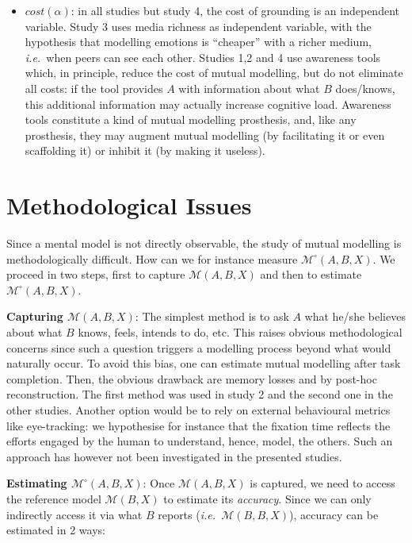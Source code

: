 \documentclass[natbib]{svjour3}
\newcommand{\ie}{{\textit{i.e.\ }}}
\newcommand{\model}[3]{{$\mathcal{M}(#1, #2, #3)$}}
\newcommand{\refmodel}[2]{{$\mathcal{M}(#1, #2)$}}
\newcommand{\Model}[3]{{$\mathcal{M}^{\circ}(#1, #2, #3)$}}
\begin{document}
\begin{itemize}
    \item $cost(\alpha)$: in all studies but study 4, the cost of  grounding is
        an independent variable. Study 3 uses media richness as independent
        variable, with the hypothesis that modelling emotions is ``cheaper'' with a
        richer medium, \ie  when peers can see each other.  Studies 1,2 and 4
        use awareness tools which, in principle, reduce the cost of mutual modelling, but do
        not eliminate all costs: if the tool provides $A$ with information about
        what $B$ does/knows, this additional information may actually increase
        cognitive load. Awareness tools constitute a kind of mutual modelling prosthesis,
        and, like any prosthesis, they may augment mutual modelling (by facilitating it or
        even scaffolding it) or inhibit it (by making it useless).

\end{itemize}


\section{Methodological Issues}

Since a mental model is not directly observable,  the study of mutual modelling is methodologically difficult. How can we for instance measure \Model{A}{B}{X}. We proceed in two steps, first to capture \model{A}{B}{X} and then to
estimate \Model{A}{B}{X}. 

{\bf Capturing \model{A}{B}{X}}: The simplest method is to ask $A$
        what he/she believes about what $B$ knows, feels, intends to do, etc.
        This raises obvious methodological concerns since such a question
        triggers a modelling process beyond what would naturally occur. To avoid
        this bias, one can estimate mutual modelling after task completion.
        Then, the obvious drawback are memory losses and by post-hoc
        reconstruction.  The first method was used in study 2 and the second one
        in the other studies. Another option would be to rely on external
        behavioural metrics like eye-tracking: we hypothesise for instance that
        the fixation time reflects the efforts engaged by the human to
        understand, hence, model, the others. Such an approach has however not
        been investigated in the presented studies.

    {\bf Estimating \Model{A}{B}{X}}: Once \model{A}{B}{X} is captured, we
        need to access the reference model \refmodel{B}{X} to estimate its
        \emph{accuracy}. Since we can only indirectly access it via what $B$
        reports (\ie \model{B}{B}{X}), accuracy can be estimated in 2 ways:
\end{document}
